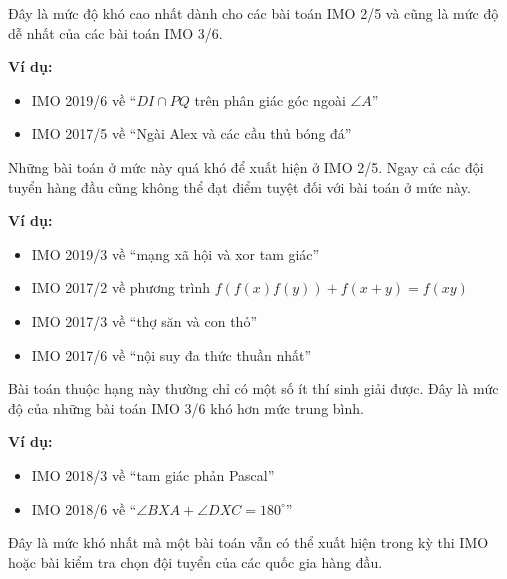 \documentclass[../imo-training-open-book.tex]{subfiles}
\begin{document}
\begin{definition*}[35M] \label{definition:35M}
    Đây là mức độ khó cao nhất dành cho các bài toán IMO 2/5 và cũng là mức độ dễ nhất của các bài toán IMO 3/6.

    \textbf{Ví dụ:}
    \begin{itemize}[topsep=0pt, partopsep=0pt, itemsep=0pt]
        \item IMO 2019/6 về ``$DI \cap PQ$ trên phân giác góc ngoài $\angle A$''
        \item IMO 2017/5 về ``Ngài Alex và các cầu thủ bóng đá''
    \end{itemize}
\end{definition*}

\begin{definition*}[40M] \label{definition:40M}
    Những bài toán ở mức này quá khó để xuất hiện ở IMO 2/5. Ngay cả các đội tuyển hàng đầu cũng không thể đạt điểm tuyệt đối với bài toán ở mức này.

    \textbf{Ví dụ:}
    \begin{itemize}[topsep=0pt, partopsep=0pt, itemsep=0pt]
        \item IMO 2019/3 về ``mạng xã hội và xor tam giác''
        \item IMO 2017/2 về phương trình $f(f(x)f(y)) + f(x+y) = f(xy)$
        \item IMO 2017/3 về ``thợ săn và con thỏ''
        \item IMO 2017/6 về ``nội suy đa thức thuần nhất''
    \end{itemize}
\end{definition*}

\begin{definition*}[45M] \label{definition:45M}
    Bài toán thuộc hạng này thường chỉ có một số ít thí sinh giải được. Đây là mức độ của những bài toán IMO 3/6 khó hơn mức trung bình.

    \textbf{Ví dụ:}
    \begin{itemize}[topsep=0pt, partopsep=0pt, itemsep=0pt]
        \item IMO 2018/3 về ``tam giác phản Pascal''
        \item IMO 2018/6 về ``$\angle BXA + \angle DXC = 180^\circ$''
    \end{itemize}
\end{definition*}

\begin{definition*}[50M] \label{definition:50M}
    Đây là mức khó nhất mà một bài toán vẫn có thể xuất hiện trong kỳ thi IMO hoặc bài kiểm tra chọn đội tuyển của các quốc gia hàng đầu.
\end{definition*}
\end{document}
